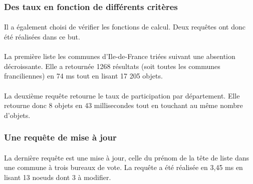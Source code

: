 \subsubsection{Des taux en fonction de différents critères}
\paragraph{}Il a également choisi de vérifier les fonctions de calcul. Deux requêtes ont donc été réalisées dans ce but.

\paragraph{}La première liste les communes d'Ile-de-France triées suivant une absention décroissante. Elle a retournée 1268 résultats (soit toutes les communes franciliennes) en 74 ms tout en lisant 17 205 objets.

\paragraph{}La deuxième requête retourne le taux de participation par département. Elle retourne donc 8 objets en 43 millisecondes tout en touchant au même nombre d'objets.

\iffalse
for $x in //elections/departement
 let $nom := $x/nom
 let $insc := sum($x/communes/commune/bureaux/bureau/inscrits)
 let $vot := sum($x/communes/commune/bureaux/bureau/votants)
 let $pct := $vot div $insc * 100
return <RESULT> {$nom} - {$pct}</RESULT>
\fi

\subsubsection{Une requête de mise à jour}
\paragraph{}La dernière requête est une mise à jour, celle du prénom de la tête de liste dans une commune à trois bureaux de vote. La requête a été réalisée en 3,45 ms en lisant 13 noeuds dont 3 à modifier.

